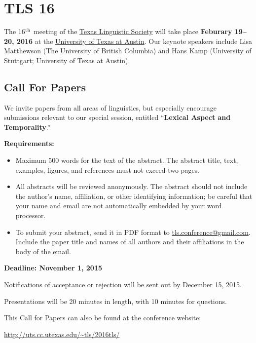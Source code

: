 \documentclass[11pt]{article}
\begin{document}
\clearpage\thispagestyle{empty}

\section*{TLS 16}

The 16$^{\rm th}$ meeting of the \href{http://uts.cc.utexas.edu/~tls}{Texas Linguistic Society} will take place \textbf{Feburary 19--20, 2016} at the \href{https://www.utexas.edu/cola/depts/linguistics/}{University of Texas at Austin}. Our keynote speakers include Lisa Matthewson (The University of British Columbia) and Hans Kamp (University of Stuttgart; University of Texas at Austin).

\subsection*{Call For Papers}

We invite papers from all areas of linguistics, but especially encourage submissions relevant to our special session, entitled ``\textbf{Lexical Aspect and Temporality}.''

\bigskip\noindent
\textbf{Requirements:}

\begin{itemize}
  \setlength{\itemsep}{2pt}
  \setlength{\parskip}{2pt}
  \item Maximum 500 words for the text of the abstract. The abstract title, text, examples, figures, and references must not exceed two pages.
  \item All abstracts will be reviewed anonymously. The abstract should not include the author’s name, affiliation, or other identifying information; be careful that your name and email are not automatically embedded by your word processor.
  \item To submit your abstract, send it in PDF format to \href{mailto:tls.conference@gmail.com}{tls.conference@gmail.com}. Include the paper title and names of all authors and their affiliations in the body of the email.
\end{itemize}

\textbf{Deadline: November 1, 2015}

\bigskip\noindent
Notifications of acceptance or rejection will be sent out by December 15, 2015.

\medskip\noindent
Presentations will be 20 minutes in length, with 10 minutes for questions.

\medskip\noindent
This Call for Papers can also be found at the conference website:

\medskip
\url{http://uts.cc.utexas.edu/~tls/2016tls/}
\end{document}
